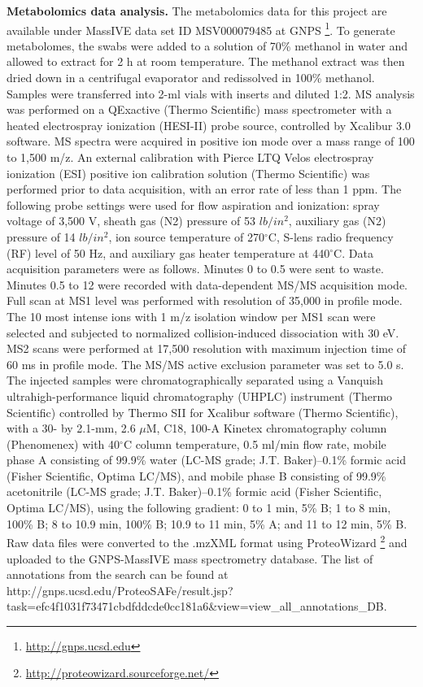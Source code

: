 \textbf{Metabolomics data analysis.} The metabolomics data for this project are
available under MassIVE data set ID MSV000079485 at GNPS \footnote{\url{http://gnps.ucsd.edu}}.
To generate metabolomes, the swabs were added to a solution of 70\% methanol in water and
allowed to extract for 2 h at room temperature. The methanol extract was then dried down in
a centrifugal evaporator and redissolved in 100\% methanol. Samples were transferred into
2-ml vials with inserts and diluted 1:2. MS analysis was performed on a QExactive
(Thermo Scientific) mass spectrometer with a heated electrospray ionization (HESI-II)
probe source, controlled by Xcalibur 3.0 software. MS spectra were acquired in positive
ion mode over a mass range of 100 to 1,500 m/z. An external calibration with Pierce LTQ
Velos electrospray ionization (ESI) positive ion calibration solution (Thermo Scientific)
was performed prior to data acquisition, with an error rate of less than 1 ppm. The following
probe settings were used for flow aspiration and ionization: spray voltage of 3,500 V,
sheath gas (N2) pressure of 53 $lb/in^2$, auxiliary gas (N2) pressure of 14 $lb/in^2$, ion
source temperature of 270$^{\circ}$C, S-lens radio frequency (RF) level of 50 Hz, and
auxiliary gas heater temperature at 440$^{\circ}$C. Data acquisition parameters were as
follows. Minutes 0 to 0.5 were sent to waste. Minutes 0.5 to 12 were recorded with
data-dependent MS/MS acquisition mode. Full scan at MS1 level was performed with
resolution of 35,000 in profile mode. The 10 most intense ions with 1 m/z isolation
window per MS1 scan were selected and subjected to normalized collision-induced dissociation
with 30 eV. MS2 scans were performed at 17,500 resolution with maximum injection time of 60
ms in profile mode. The MS/MS active exclusion parameter was set to 5.0 s. The injected
samples were chromatographically separated using a Vanquish ultrahigh-performance
liquid chromatography (UHPLC) instrument (Thermo Scientific) controlled by Thermo SII for
Xcalibur software (Thermo Scientific), with a 30- by 2.1-mm, 2.6 $\mu$M, C18, 100-A
Kinetex chromatography column (Phenomenex) with 40$^{\circ}$C column temperature, 0.5
ml/min flow rate, mobile phase A consisting of 99.9\% water (LC-MS grade; J.T. Baker)–0.1\%
formic acid (Fisher Scientific, Optima LC/MS), and mobile phase B consisting of 99.9\%
acetonitrile (LC-MS grade; J.T. Baker)–0.1\% formic acid (Fisher Scientific, Optima LC/MS),
using the following gradient: 0 to 1 min, 5\% B; 1 to 8 min, 100\% B; 8 to 10.9 min,
100\% B; 10.9 to 11 min, 5\% A; and 11 to 12 min, 5\% B. Raw data files were converted
to the .mzXML format using ProteoWizard \footnote{\url{http://proteowizard.sourceforge.net/}}
and uploaded to the GNPS-MassIVE mass spectrometry database. The list of annotations
from the search can be found at
http://gnps.ucsd.edu/ProteoSAFe/result.jsp?task=efc4f1031f73471cbdfddcde0cc181a6\&view=view\_all\_annotations\_DB.

